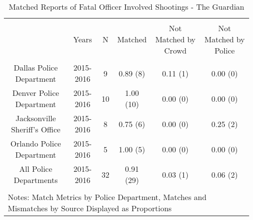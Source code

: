 
\begin{table}[!htbp] \centering 
  \caption{Matched Reports of Fatal Officer Involved Shootings - The Guardian} 
  \label{} 
\footnotesize 
\begin{tabular}{@{\extracolsep{5pt}} cccccc} 
\\[-1.8ex]\hline 
\hline \\[-1.8ex] 
 & Years & N & Matched & Not Matched by Crowd & Not Matched by Police \\ 
\hline \\[-1.8ex] 
Dallas Police Department & 2015-2016 & 9 & 0.89 (8) & 0.11 (1) & 0.00 (0) \\ 
Denver Police Department & 2015-2016 & 10 & 1.00 (10) & 0.00 (0) & 0.00 (0) \\ 
Jacksonville Sheriff's Office & 2015-2016 & 8 & 0.75 (6) & 0.00 (0) & 0.25 (2) \\ 
Orlando Police Department & 2015-2016 & 5 & 1.00 (5) & 0.00 (0) & 0.00 (0) \\ 
All Police Departments   & 2015-2016 & 32 & 0.91 (29) & 0.03 (1) & 0.06 (2) \\ 
\hline \\[-1.8ex] 
\multicolumn{6}{l}{Notes: Match Metrics by Police Department, Matches and Mismatches by Source Displayed as Proportions} \\ 
\end{tabular} 
\end{table}  
